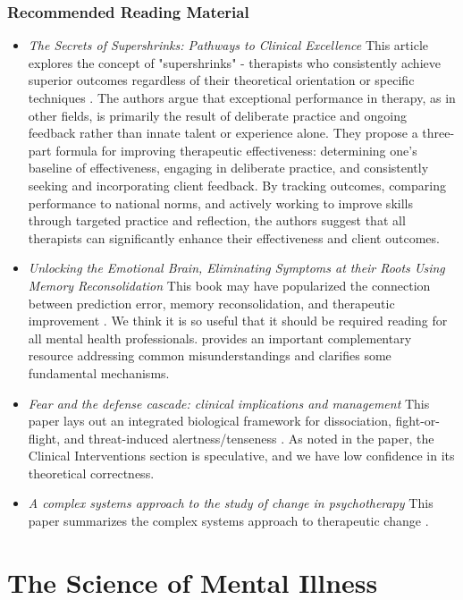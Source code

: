 \documentclass[12pt,letterpaper]{book}
\begin{document}
\subsection*{Recommended Reading Material}
\begin{itemize}
	\item \textit{The Secrets of Supershrinks: Pathways to Clinical Excellence} This article explores the concept of "supershrinks" - therapists who consistently achieve superior outcomes regardless of their theoretical orientation or specific techniques \cite{miller2014secrets}. The authors argue that exceptional performance in therapy, as in other fields, is primarily the result of deliberate practice and ongoing feedback rather than innate talent or experience alone. They propose a three-part formula for improving therapeutic effectiveness: determining one's baseline of effectiveness, engaging in deliberate practice, and consistently seeking and incorporating client feedback. By tracking outcomes, comparing performance to national norms, and actively working to improve skills through targeted practice and reflection, the authors suggest that all therapists can significantly enhance their effectiveness and client outcomes.
	\item \textit{Unlocking the Emotional Brain, Eliminating Symptoms at their Roots Using Memory Reconsolidation} This book may have popularized the connection between prediction error, memory reconsolidation, and therapeutic improvement \cite{eckerUnlocking}. We think it is so useful that it should be required reading for all mental health professionals. \textcite{ecker2015misunderstood} provides an important complementary resource addressing common misunderstandings and clarifies some fundamental mechanisms.
	\item \textit{Fear and the defense cascade: clinical implications and management} This paper lays out an integrated biological framework for dissociation, fight-or-flight, and threat-induced alertness/tenseness \cite{kozlowskaDefenseCascade}. As noted in the paper, the Clinical Interventions section is speculative, and we have low confidence in its theoretical correctness.
	\item \textit{A complex systems approach to the study of change in psychotherapy} This paper summarizes the complex systems approach to therapeutic change \cite{hayes2020complex}.
\end{itemize}
\chapter{The Science of Mental Illness}
\label{science}
\end{document}
